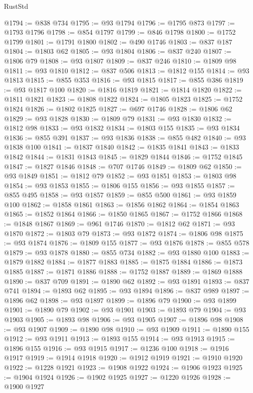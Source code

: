 \begin{lexlean}{RustStd}
\begin{coremodule}
@1794 := @838 @734
@1795 := @93 @1794
@1796 := @1795 @873
@1797 := @1793 @1796
@1798 := @854 @1797
@1799 := @846 @1798
@1800 := @1752 @1799
@1801 := @1791 @1800
@1802 := @490 @1746
@1803 := @837 @187
@1804 := @1803 @62
@1805 := @93 @1804
@1806 := @837 @240
@1807 := @1806 @79
@1808 := @93 @1807
@1809 := @837 @246
@1810 := @1809 @98
@1811 := @93 @1810
@1812 := @837 @506
@1813 := @1812 @155
@1814 := @93 @1813
@1815 := @855 @353
@1816 := @93 @1815
@1817 := @855 @386
@1819 := @93 @1817 @100
@1820 := @1816 @1819
@1821 := @1814 @1820
@1822 := @1811 @1821
@1823 := @1808 @1822
@1824 := @1805 @1823
@1825 := @1752 @1824
@1826 := @1802 @1825
@1827 := @697 @1746
@1828 := @1806 @62
@1829 := @93 @1828
@1830 := @1809 @79
@1831 := @93 @1830
@1832 := @1812 @98
@1833 := @93 @1832
@1834 := @1803 @155
@1835 := @93 @1834
@1836 := @855 @391
@1837 := @93 @1836
@1838 := @855 @482
@1840 := @93 @1838 @100
@1841 := @1837 @1840
@1842 := @1835 @1841
@1843 := @1833 @1842
@1844 := @1831 @1843
@1845 := @1829 @1844
@1846 := @1752 @1845
@1847 := @1827 @1846
@1848 := @707 @1746
@1849 := @1809 @62
@1850 := @93 @1849
@1851 := @1812 @79
@1852 := @93 @1851
@1853 := @1803 @98
@1854 := @93 @1853
@1855 := @1806 @155
@1856 := @93 @1855
@1857 := @855 @495
@1858 := @93 @1857
@1859 := @855 @500
@1861 := @93 @1859 @100
@1862 := @1858 @1861
@1863 := @1856 @1862
@1864 := @1854 @1863
@1865 := @1852 @1864
@1866 := @1850 @1865
@1867 := @1752 @1866
@1868 := @1848 @1867
@1869 := @961 @1746
@1870 := @1812 @62
@1871 := @93 @1870
@1872 := @1803 @79
@1873 := @93 @1872
@1874 := @1806 @98
@1875 := @93 @1874
@1876 := @1809 @155
@1877 := @93 @1876
@1878 := @855 @578
@1879 := @93 @1878
@1880 := @855 @734
@1882 := @93 @1880 @100
@1883 := @1879 @1882
@1884 := @1877 @1883
@1885 := @1875 @1884
@1886 := @1873 @1885
@1887 := @1871 @1886
@1888 := @1752 @1887
@1889 := @1869 @1888
@1890 := @837 @709
@1891 := @1890 @62
@1892 := @93 @1891
@1893 := @837 @741
@1894 := @1893 @62
@1895 := @93 @1894
@1896 := @837 @989
@1897 := @1896 @62
@1898 := @93 @1897
@1899 := @1896 @79
@1900 := @93 @1899
@1901 := @1890 @79
@1902 := @93 @1901
@1903 := @1893 @79
@1904 := @93 @1903
@1905 := @1893 @98
@1906 := @93 @1905
@1907 := @1896 @98
@1908 := @93 @1907
@1909 := @1890 @98
@1910 := @93 @1909
@1911 := @1890 @155
@1912 := @93 @1911
@1913 := @1893 @155
@1914 := @93 @1913
@1915 := @1896 @155
@1916 := @93 @1915
@1917 := @1236 @100
@1918 := @1916 @1917
@1919 := @1914 @1918
@1920 := @1912 @1919
@1921 := @1910 @1920
@1922 := @1228 @1921
@1923 := @1908 @1922
@1924 := @1906 @1923
@1925 := @1904 @1924
@1926 := @1902 @1925
@1927 := @1220 @1926
@1928 := @1900 @1927

\end{coremodule}
\end{lexlean}
